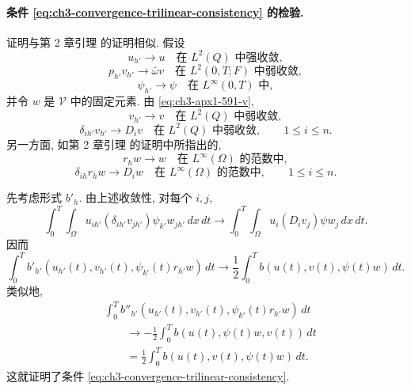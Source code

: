 \paragraph{条件 \eqref{eq:ch3-convergence-trilinear-consistency} 的检验.}
证明与第 2 章引理  的证明相似. 假设
\begin{equation}
u_{h'}\to u\quad\text{在 $L^2(Q)$ 中强收敛},
\label{eq:ch3-apx1-591-u}
\end{equation}
\begin{equation}
p_{h'}v_{h'}\to\bar\omega v\quad\text{在 $L^2(0,T;F)$ 中弱收敛},
\label{eq:ch3-apx1-591-v}
\end{equation}
\begin{equation}
\psi_{h'}\to\psi\quad\text{在 $L^\infty(0,T)$ 中},
\label{eq:ch3-apx1-591-psi}
\end{equation}
并令 $w$ 是 $\mathcal V$ 中的固定元素. 由 \eqref{eq:ch3-apx1-591-v},
\begin{equation}
v_{h'}\to v\quad\text{在 $L^2(Q)$ 中弱收敛},
\label{eq:ch3-apx1-591-v-l2}
\end{equation}
\begin{equation}
\delta_{ih'}v_{h'}\to D_i v\quad\text{在 $L^2(Q)$ 中弱收敛},
\qquad1\leq i\leq n.
\label{eq:ch3-apx1-591-v-gradient}
\end{equation}
另一方面, 如第 2 章引理  的证明中所指出的,
\begin{equation}
r_hw\to w\quad\text{在 $L^\infty(\Omega)$ 的范数中},
\label{eq:ch3-apx1-test-interpolation}
\end{equation}
\begin{equation}
\delta_{ih}r_hw\to D_iw\quad\text{在 $L^\infty(\Omega)$ 的范数中},
\qquad1\leq i\leq n.
\label{eq:ch3-apx1-test-gradient-interpolation}
\end{equation}

\hypertarget{chapter-03-page-266}{}
先考虑形式 $b'_h$. 由上述收敛性, 对每个 $i,j$,
\[
\int_0^T\!\int_\Omega u_{ih'}(\delta_{ih'}v_{jh'})\psi_{k'}w_{jh'}\,dx\,dt
\to\int_0^T\!\int_\Omega u_i(D_iv_j)\psi w_j\,dx\,dt.
\]
因而
\[
\int_0^T b'_{h'}(u_{h'}(t),v_{h'}(t),\psi_{k'}(t)r_{h'}w)\,dt
\to\frac12\int_0^T b(u(t),v(t),\psi(t)w)\,dt.
\]
类似地,
\begin{align*}
&\int_0^T b''_{h'}(u_{h'}(t),v_{h'}(t),\psi_{k'}(t)r_{h'}w)\,dt\\
&\qquad\to-\frac12\int_0^T b(u(t),\psi(t)w,v(t))\,dt\\
&\qquad=\frac12\int_0^T b(u(t),v(t),\psi(t)w)\,dt.
\end{align*}
这就证明了条件 \eqref{eq:ch3-convergence-trilinear-consistency}.

